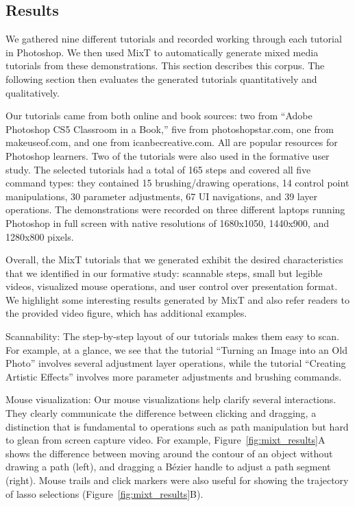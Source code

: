 \subsection{Results}

We gathered nine different tutorials and recorded working through each tutorial in Photoshop. We then used MixT to automatically generate mixed media tutorials from these demonstrations. This section describes this corpus. The following section then evaluates the generated tutorials quantitatively and qualitatively.

Our tutorials came from both online and book sources: two from ``Adobe Photoshop CS5 Classroom in a Book,'' five from photoshopstar.com, one from makeuseof.com, and one from icanbecreative.com. All are popular resources for Photoshop learners. Two of the tutorials were also used in the formative user study. The selected tutorials had a total of 165 steps and covered all five command types: they contained 15 brushing/drawing operations, 14 control point manipulations, 30 parameter adjustments, 67 UI navigations, and 39 layer operations. The demonstrations were recorded on three different laptops running Photoshop in full screen with native resolutions of 1680x1050, 1440x900, and 1280x800 pixels.

Overall, the MixT tutorials that we generated exhibit the desired characteristics that we identified in our formative study: scannable steps, small but legible videos, visualized mouse operations, and user control over presentation format. We highlight some interesting results generated by MixT and also refer readers to the provided video figure, which has additional examples.

Scannability: The step-by-step layout of our tutorials makes them easy to scan. For example, at a glance, we see that the tutorial ``Turning an Image into an Old Photo'' involves several adjustment layer operations, while the tutorial ``Creating Artistic Effects'' involves more parameter adjustments and brushing commands.

Mouse visualization: Our mouse visualizations help clarify several interactions. They clearly communicate the difference between clicking and dragging, a distinction that is fundamental to operations such as path manipulation but hard to glean from screen capture video. For example, Figure~\ref{fig:mixt_results}A shows the difference between moving around the contour of an object without drawing a path (left), and dragging a Bézier handle to adjust a path segment (right). Mouse trails and click markers were also useful for showing the trajectory of lasso selections (Figure~\ref{fig:mixt_results}B).

